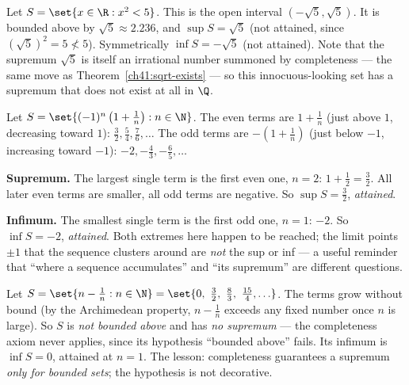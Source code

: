 \begin{example}
\label{ch41:ex2}
Let $S = \set{x\in\R : x^2 < 5}$. This is the open interval $(-\sqrt5,\sqrt5)$. It is
bounded above by $\sqrt5\approx2.236$, and $\sup S=\sqrt5$ (not attained, since
$(\sqrt5)^2=5\not<5$). Symmetrically $\inf S = -\sqrt5$ (not attained). Note that the
supremum $\sqrt5$ is itself an irrational number summoned by completeness --- the same move
as Theorem~\ref{ch41:sqrt-exists} --- so this innocuous-looking set has a supremum that
does not exist at all in $\Q$.
\end{example}

\begin{example}
\label{ch41:ex3}
Let $S = \set{(-1)^n\left(1+\tfrac1n\right) : n\in\N}$. The even terms are
$1+\frac1n$ (just above $1$, decreasing toward $1$): $\frac32, \frac54, \frac76,\ldots$
The odd terms are $-(1+\frac1n)$ (just below $-1$, increasing toward $-1$):
$-2, -\frac43, -\frac65,\ldots$

\textbf{Supremum.} The largest single term is the first even one, $n=2$: $1+\frac12=\frac32$.
All later even terms are smaller, all odd terms are negative. So $\sup S = \frac32$,
\emph{attained}.

\textbf{Infimum.} The smallest single term is the first odd one, $n=1$: $-2$. So
$\inf S = -2$, \emph{attained}. Both extremes here happen to be reached; the limit points
$\pm1$ that the sequence clusters around are \emph{not} the sup or inf --- a useful reminder
that ``where a sequence accumulates'' and ``its supremum'' are different questions.
\end{example}

\begin{example}
\label{ch41:ex4}
Let $S = \set{n - \tfrac1n : n\in\N} = \set{0,\ \tfrac32,\ \tfrac83,\ \tfrac{15}{4},\ldots}$.
The terms grow without bound (by the Archimedean property, $n-\frac1n$ exceeds any fixed
number once $n$ is large). So $S$ is \emph{not bounded above} and has \emph{no supremum} ---
the completeness axiom never applies, since its hypothesis ``bounded above'' fails. Its
infimum is $\inf S=0$, attained at $n=1$. The lesson: completeness guarantees a supremum
\emph{only for bounded sets}; the hypothesis is not decorative.
\end{example}

